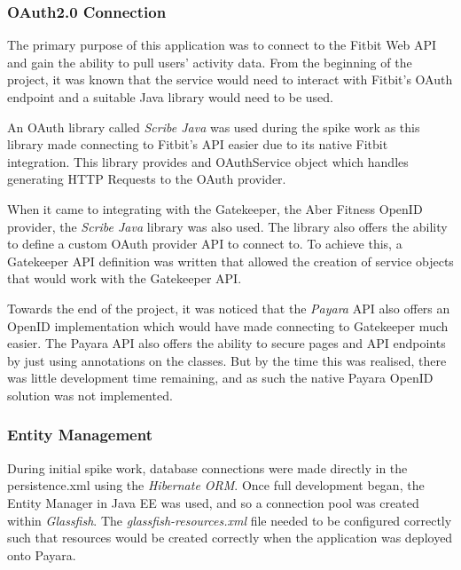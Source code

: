 \subsubsection{OAuth2.0 Connection}

\par
The primary purpose of this application was to connect to the Fitbit Web API and gain the ability to pull users' activity data. From the beginning of the project, it was known that the service would need to interact with Fitbit's OAuth endpoint and a suitable Java library would need to be used.
\par
An OAuth library called \textit{Scribe Java}\cite{ScribeJava} was used during the spike work as this library made connecting to Fitbit's API easier due to its native Fitbit integration. This library provides and OAuthService object which handles generating HTTP Requests to the OAuth provider.
\par
When it came to integrating with the Gatekeeper, the Aber Fitness OpenID provider,  the \textit{Scribe Java}\cite{ScribeJava} library was also used. The library also offers the ability to define a custom OAuth provider API to connect to. To achieve this, a Gatekeeper API definition was written that allowed the creation of service objects that would work with the Gatekeeper API.
\par
Towards the end of the project, it was noticed that the \textit{Payara}\cite{payara} API also offers an OpenID implementation which would have made connecting to Gatekeeper much easier. The Payara API also offers the ability to secure pages and API endpoints by just using annotations on the classes. But by the time this was realised, there was little development time remaining, and as such the native Payara OpenID solution was not implemented.

\subsubsection{Entity Management}

\par
During initial spike work, database connections were made directly in the persistence.xml using the \textit{Hibernate ORM}\cite{Hibernate}. Once full development began, the Entity Manager in Java EE was used, and so a connection pool was created within \textit{Glassfish}\cite{glassfish}. The \textit{glassfish-resources.xml} file needed to be configured correctly such that resources would be created correctly when the application was deployed onto Payara.

